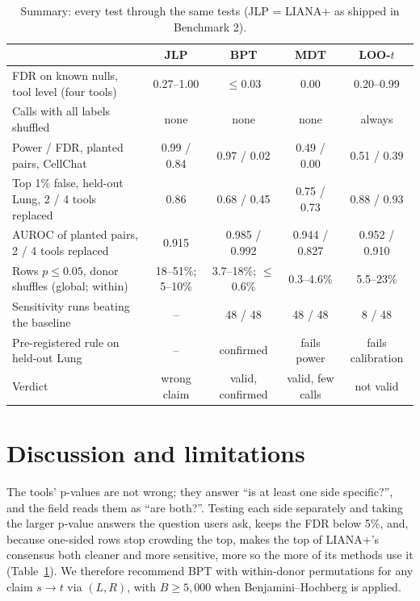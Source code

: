 \documentclass[11pt]{article}
\newcommand{\JLP}{JLP}
\newcommand{\BPT}{BPT}
\newcommand{\MDT}{MDT}
\newcommand{\LOO}{LOO-$t$}
\newcommand{\st}{$s\!\to\!t$}
\begin{document}
\begin{table}[!tb]
\centering\footnotesize\setlength{\tabcolsep}{4pt}
\caption{Summary: every test through the same tests (\JLP{} = LIANA+ as shipped in Benchmark 2).}
\label{tab:summary}
\begin{tabularx}{\textwidth}{@{}Xcccc@{}}
\toprule
 & \JLP & \BPT & \MDT & \LOO\\
\midrule
FDR on known nulls, tool level (four tools) & 0.27--1.00 & $\le$0.03 & 0.00 & 0.20--0.99\\
Calls with all labels shuffled & none & none & none & always\\
Power / FDR, planted pairs, CellChat & 0.99 / 0.84 & 0.97 / 0.02 & 0.49 / 0.00 & 0.51 / 0.39\\
Top 1\% false, held-out Lung, 2 / 4 tools replaced & 0.86 & 0.68 / 0.45 & 0.75 / 0.73 & 0.88 / 0.93\\
AUROC of planted pairs, 2 / 4 tools replaced & 0.915 & 0.985 / 0.992 & 0.944 / 0.827 & 0.952 / 0.910\\
Rows $p\le0.05$, donor shuffles (global; within) & 18--51\%; 5--10\% & 3.7--18\%; $\le$0.6\% & 0.3--4.6\% & 5.5--23\%\\
Sensitivity runs beating the baseline & -- & 48 / 48 & 48 / 48 & 8 / 48\\
Pre-registered rule on held-out Lung & -- & confirmed & fails power & fails calibration\\
\midrule
Verdict & wrong claim & valid, confirmed & valid, few calls & not valid\\
\bottomrule
\end{tabularx}
\end{table}

\section{Discussion and limitations}

The tools' p-values are not wrong; they answer ``is at least one side specific?'', and the field reads them as ``are
both?''. Testing each side separately and taking the larger p-value answers the question users ask, keeps the FDR
below 5\%, and, because one-sided rows stop crowding the top, makes the top of LIANA+'s consensus both cleaner and
more sensitive, more so the more of its methods use it (Table~\ref{tab:summary}). We therefore recommend \BPT{} with
within-donor permutations for any claim \st{} via $(L,R)$, with $B\ge5{,}000$ when Benjamini--Hochberg is applied.
\end{document}
